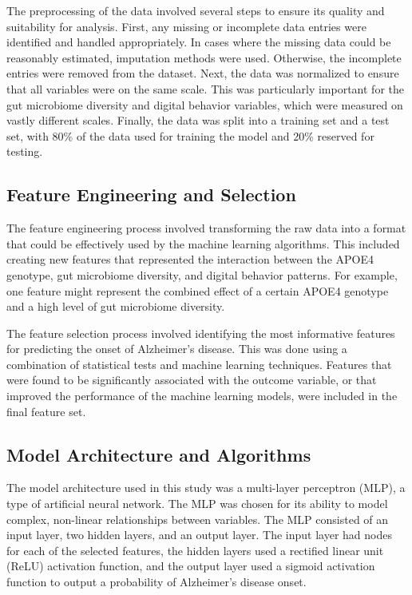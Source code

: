 \documentclass[conference]{IEEEtran}
\begin{document}
The preprocessing of the data involved several steps to ensure its quality and suitability for analysis. First, any missing or incomplete data entries were identified and handled appropriately. In cases where the missing data could be reasonably estimated, imputation methods were used. Otherwise, the incomplete entries were removed from the dataset. Next, the data was normalized to ensure that all variables were on the same scale. This was particularly important for the gut microbiome diversity and digital behavior variables, which were measured on vastly different scales. Finally, the data was split into a training set and a test set, with 80\% of the data used for training the model and 20\% reserved for testing.

\subsection{Feature Engineering and Selection}

The feature engineering process involved transforming the raw data into a format that could be effectively used by the machine learning algorithms. This included creating new features that represented the interaction between the APOE4 genotype, gut microbiome diversity, and digital behavior patterns. For example, one feature might represent the combined effect of a certain APOE4 genotype and a high level of gut microbiome diversity.

The feature selection process involved identifying the most informative features for predicting the onset of Alzheimer's disease. This was done using a combination of statistical tests and machine learning techniques. Features that were found to be significantly associated with the outcome variable, or that improved the performance of the machine learning models, were included in the final feature set.

\subsection{Model Architecture and Algorithms}

The model architecture used in this study was a multi-layer perceptron (MLP), a type of artificial neural network. The MLP was chosen for its ability to model complex, non-linear relationships between variables. The MLP consisted of an input layer, two hidden layers, and an output layer. The input layer had nodes for each of the selected features, the hidden layers used a rectified linear unit (ReLU) activation function, and the output layer used a sigmoid activation function to output a probability of Alzheimer's disease onset.
\end{document}
